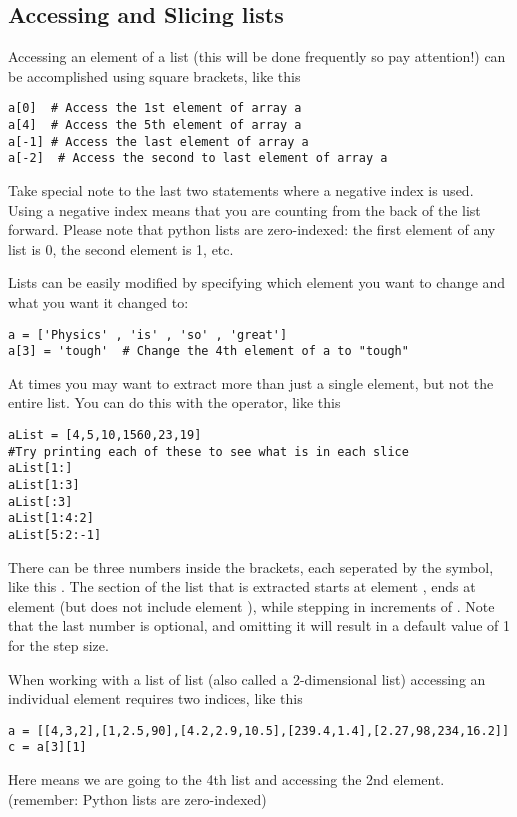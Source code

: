 \subsection*{Accessing and Slicing lists}
Accessing an element of a list (this will be done frequently so pay
attention!) can be accomplished using square brackets, like this
\begin{Verbatim}
a[0]  # Access the 1st element of array a
a[4]  # Access the 5th element of array a
a[-1] # Access the last element of array a
a[-2]  # Access the second to last element of array a
\end{Verbatim}
Take special note to the last two statements where a negative index is
used.  Using a negative index means that you are counting from the
back of the list forward.
Please note that python lists are zero-indexed: the first element of
any list is 0, the second element is 1, etc.

Lists can be easily
modified by specifying which element you want to change and what you
want it changed to:
\begin{Verbatim}
a = ['Physics' , 'is' , 'so' , 'great']
a[3] = 'tough'  # Change the 4th element of a to "tough"
\end{Verbatim}
At times you may want to extract more than just a single element, but
not the entire list.  You can do this with the \code{:} operator, like
this
\begin{Verbatim}
aList = [4,5,10,1560,23,19]
#Try printing each of these to see what is in each slice
aList[1:]
aList[1:3]
aList[:3]
aList[1:4:2]
aList[5:2:-1]
\end{Verbatim}
There can be three numbers inside the brackets, each seperated by the
\code{:} symbol, like this \code{[x:y:z]}.  The section of the
list that is extracted starts at element , ends at element
 (but does not include element ), while stepping in
increments of .  Note that the last number is optional, and
omitting it will result in a default value of 1 for the step size.


When working with a list of list (also called a 2-dimensional list)
accessing an individual element requires two indices, like this
\begin{Verbatim}
a = [[4,3,2],[1,2.5,90],[4.2,2.9,10.5],[239.4,1.4],[2.27,98,234,16.2]]
c = a[3][1]
\end{Verbatim}
Here \code{[3][1]} means we are going to the 4th list and accessing the 2nd element. (remember: Python lists are zero-indexed)

